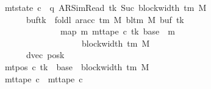 \begin{isabellebody}
\ \ \ \ \ \ \ \ \ \ \ \ \ \ {\isasymand}\ mt{\isacharunderscore}{\kern0pt}state\ c{\isacharprime}{\kern0pt}{\isacharprime}{\kern0pt}\ {\isacharequal}{\kern0pt}\ {\isacharparenleft}{\kern0pt}q{\isacharcomma}{\kern0pt}\ AR{\isacharunderscore}{\kern0pt}SimRead{\isacharcomma}{\kern0pt}\ tk{\isacharcomma}{\kern0pt}\ Suc\ {\isacharparenleft}{\kern0pt}block{\isacharunderscore}{\kern0pt}width\ {\isacharparenleft}{\kern0pt}{\isasymGamma}{\isacharunderscore}{\kern0pt}tm\ M{\isacharparenright}{\kern0pt}{\isacharparenright}{\kern0pt}{\isacharcomma}{\kern0pt}\isanewline
\ \ \ \ \ \ \ \ \ \ \ \ \ \ \ \ \ \ \ \ buf{}{\isacharparenleft}{\kern0pt}tk\ {\isacharcolon}{\kern0pt}{\isacharequal}{\kern0pt}\ foldl\ {\isacharparenleft}{\kern0pt}ar{\isacharunderscore}{\kern0pt}acc\ {\isacharparenleft}{\kern0pt}{\isasymGamma}{\isacharunderscore}{\kern0pt}tm\ M{\isacharparenright}{\kern0pt}\ {\isacharparenleft}{\kern0pt}bl{\isacharunderscore}{\kern0pt}tm\ M{\isacharparenright}{\kern0pt}{\isacharparenright}{\kern0pt}\ {\isacharparenleft}{\kern0pt}buf{}\ tk{\isacharparenright}{\kern0pt}\isanewline
\ \ \ \ \ \ \ \ \ \ \ \ \ \ \ \ \ \ \ \ \ \ \ \ \ \ \ \ {\isacharparenleft}{\kern0pt}map\ {\isacharparenleft}{\kern0pt}{\isasymlambda}m{\isachardot}{\kern0pt}\ mt{\isacharunderscore}{\kern0pt}tape\ c{\isacharprime}{\kern0pt}\ tk\ {\isacharparenleft}{\kern0pt}base\ {\isacharplus}{\kern0pt}\ m{\isacharparenright}{\kern0pt}{\isacharparenright}{\kern0pt}\isanewline
\ \ \ \ \ \ \ \ \ \ \ \ \ \ \ \ \ \ \ \ \ \ \ \ \ \ \ \ \ \ \ \ \ {\isacharbrackleft}{\kern0pt}{}{\isachardot}{\kern0pt}{\isachardot}{\kern0pt}{\isacharless}{\kern0pt}block{\isacharunderscore}{\kern0pt}width\ {\isacharparenleft}{\kern0pt}{\isasymGamma}{\isacharunderscore}{\kern0pt}tm\ M{\isacharparenright}{\kern0pt}\ {\isacharminus}{\kern0pt}\ {}{\isacharbrackright}{\kern0pt}{\isacharparenright}{\kern0pt}{\isacharparenright}{\kern0pt}{\isacharcomma}{\kern0pt}\isanewline
\ \ \ \ \ \ \ \ \ \ \ \ \ \ \ \ \ \ \ \ dvec{\isacharcomma}{\kern0pt}\ posk{\isacharparenright}{\kern0pt}\isanewline
\ \ \ \ \ \ \ \ \ \ \ \ \ \ {\isasymand}\ mt{\isacharunderscore}{\kern0pt}pos\ c{\isacharprime}{\kern0pt}{\isacharprime}{\kern0pt}\ tk\ {\isacharequal}{\kern0pt}\ base\ {\isacharplus}{\kern0pt}\ {\isacharparenleft}{\kern0pt}block{\isacharunderscore}{\kern0pt}width\ {\isacharparenleft}{\kern0pt}{\isasymGamma}{\isacharunderscore}{\kern0pt}tm\ M{\isacharparenright}{\kern0pt}\ {\isacharminus}{\kern0pt}\ {}{\isacharparenright}{\kern0pt}\isanewline
\ \ \ \ \ \ \ \ \ \ \ \ \ \ {\isasymand}\ mt{\isacharunderscore}{\kern0pt}tape\ c{\isacharprime}{\kern0pt}{\isacharprime}{\kern0pt}\ {\isacharequal}{\kern0pt}\ mt{\isacharunderscore}{\kern0pt}tape\ c{\isacharprime}{\kern0pt}\isanewline

\end{isabellebody}
